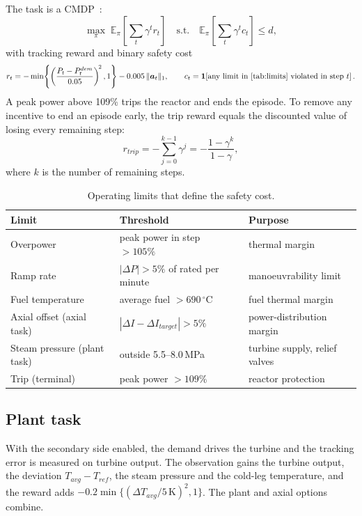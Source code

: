 \documentclass[11pt,a4paper]{article}
\begin{document}
The task is a CMDP~\cite{altman1999}:
\begin{equation}
  \max_\pi\; \mathbb{E}_\pi\!\left[\sum_t \gamma^t r_t\right]
  \quad\text{s.t.}\quad
  \mathbb{E}_\pi\!\left[\sum_t \gamma^t c_t\right] \le d,
\end{equation}
with tracking reward and binary safety cost
\begin{equation}
  r_t = -\min\!\left\{\left(\frac{P_t - P^{dem}_t}{0.05}\right)^{\!2}, 1\right\} - 0.005\,\lVert\bm a_t\rVert_1,
  \qquad
  c_t = \mathbf{1}\!\left[\text{any limit in \cref{tab:limits} violated in step } t\right].
\end{equation}
A peak power above 109\% trips the reactor and ends the episode. To remove any
incentive to end an episode early, the trip reward equals the discounted value of
losing every remaining step:
\begin{equation}
  r_{trip} = -\sum_{j=0}^{k-1}\gamma^j = -\frac{1-\gamma^{k}}{1-\gamma},
\end{equation}
where $k$ is the number of remaining steps.

\begin{table}[!htbp]
  \centering
  \caption{Operating limits that define the safety cost.}
  \label{tab:limits}
  \small
  \begin{tabular}{@{}lll@{}}
    \toprule
    Limit & Threshold & Purpose \\
    \midrule
    Overpower & peak power in step $>105\%$ & thermal margin \\
    Ramp rate & $|\Delta P| > 5\%$ of rated per minute & manoeuvrability limit~\cite{eur} \\
    Fuel temperature & average fuel $>690\,^\circ$C & fuel thermal margin \\
    Axial offset (axial task) & $|\Delta I - \Delta I_{target}| > 5\%$ & power-distribution margin \\
    Steam pressure (plant task) & outside 5.5--8.0\,MPa & turbine supply, relief valves \\
    Trip (terminal) & peak power $>109\%$ & reactor protection \\
    \bottomrule
  \end{tabular}
\end{table}

\subsection{Plant task}

With the secondary side enabled, the demand drives the turbine and the tracking error
is measured on turbine output. The observation gains the turbine output, the deviation
$T_{avg} - T_{ref}$, the steam pressure and the cold-leg temperature, and the reward
adds $-0.2\min\{(\Delta T_{avg}/5\,\mathrm{K})^2, 1\}$. The plant and axial options
combine.
\end{document}
